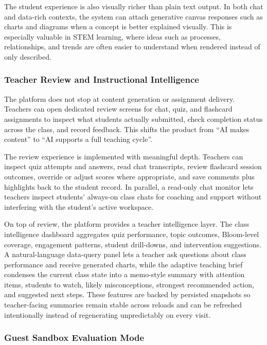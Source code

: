 \documentclass[11pt,a4paper]{article}
\begin{document}
The student experience is also visually richer than plain text output. In both chat and data-rich
contexts, the system can attach generative canvas responses such as charts and diagrams when a
concept is better explained visually. This is especially valuable in STEM learning, where ideas
such as processes, relationships, and trends are often easier to understand when rendered instead
of only described.

\subsubsection*{Teacher Review and Instructional Intelligence}

The platform does not stop at content generation or assignment delivery. Teachers can open dedicated
review screens for chat, quiz, and flashcard assignments to inspect what students actually
submitted, check completion status across the class, and record feedback. This shifts the product
from ``AI makes content'' to ``AI supports a full teaching cycle''.

The review experience is implemented with meaningful depth. Teachers can inspect quiz attempts and
answers, read chat transcripts, review flashcard session outcomes, override or adjust scores where
appropriate, and save comments plus highlights back to the student record. In parallel, a
read-only chat monitor lets teachers inspect students' always-on class chats for coaching and
support without interfering with the student's active workspace.

On top of review, the platform provides a teacher intelligence layer. The class intelligence
dashboard aggregates quiz performance, topic outcomes, Bloom-level coverage, engagement patterns,
student drill-downs, and intervention suggestions. A natural-language data-query panel lets a
teacher ask questions about class performance and receive generated charts, while the adaptive
teaching brief condenses the current class state into a memo-style summary with attention items,
students to watch, likely misconceptions, strongest recommended action, and suggested next steps.
These features are backed by persisted snapshots so teacher-facing summaries remain stable across
reloads and can be refreshed intentionally instead of regenerating unpredictably on every visit.

\subsubsection*{Guest Sandbox Evaluation Mode}
\end{document}

